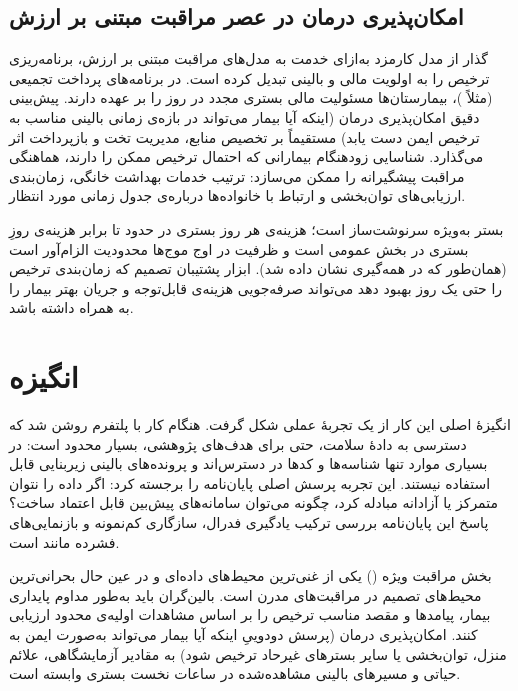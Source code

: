 \subsection{امکان‌پذیری درمان در عصر مراقبت مبتنی بر ارزش}

گذار از مدل کارمزد به‌ازای خدمت به مدل‌های مراقبت مبتنی بر ارزش، برنامه‌ریزی ترخیص را به اولویت مالی و بالینی تبدیل کرده است. در برنامه‌های پرداخت تجمیعی (مثلاً )، بیمارستان‌ها مسئولیت مالی بستری مجدد در  روز را بر عهده دارند. پیش‌بینی دقیق امکان‌پذیری درمان (اینکه آیا بیمار می‌تواند در بازه‌ی زمانی بالینی مناسب به ترخیص ایمن دست یابد) مستقیماً بر تخصیص منابع، مدیریت تخت و بازپرداخت اثر می‌گذارد. شناسایی زودهنگام بیمارانی که احتمال ترخیص ممکن را دارند، هماهنگی مراقبت پیشگیرانه را ممکن می‌سازد: ترتیب خدمات بهداشت خانگی، زمان‌بندی ارزیابی‌های توان‌بخشی و ارتباط با خانواده‌ها درباره‌ی جدول زمانی مورد انتظار.

بستر  به‌ویژه سرنوشت‌ساز است؛ هزینه‌ی هر روز بستری در  حدود  تا  برابر هزینه‌ی روزِ بستری در بخش عمومی است و ظرفیت  در اوج موج‌ها محدودیت الزام‌آور است (همان‌طور که در همه‌گیری  نشان داده شد). ابزار پشتیبان تصمیم که زمان‌بندی ترخیص را حتی یک روز بهبود دهد می‌تواند صرفه‌جویی هزینه‌ی قابل‌توجه و جریان بهتر بیمار را به همراه داشته باشد.

\section{انگیزه}

انگیزۀ اصلی این کار از یک تجربۀ عملی شکل گرفت. هنگام کار با پلتفرم  روشن شد که دسترسی به دادۀ سلامت، حتی برای هدف‌های پژوهشی، بسیار محدود است: در بسیاری موارد تنها شناسه‌ها و کدها در دسترس‌اند و پرونده‌های بالینی زیربنایی قابل استفاده نیستند. این تجربه پرسش اصلی پایان‌نامه را برجسته کرد: اگر داده را نتوان متمرکز یا آزادانه مبادله کرد، چگونه می‌توان سامانه‌های پیش‌بین قابل اعتماد ساخت؟ پاسخ این پایان‌نامه بررسی ترکیب یادگیری فدرال، سازگاری کم‌نمونه و بازنمایی‌های فشرده مانند  است.

بخش مراقبت ویژه () یکی از غنی‌ترین محیط‌های داده‌ای و در عین حال بحرانی‌ترین محیط‌های تصمیم در مراقبت‌های مدرن است. بالین‌گران باید به‌طور مداوم پایداری بیمار، پیامدها و مقصد مناسب ترخیص را بر اساس مشاهدات اولیه‌ی محدود ارزیابی کنند. امکان‌پذیری درمان (پرسش دودوییِ اینکه آیا بیمار می‌تواند به‌صورت ایمن به منزل، توان‌بخشی یا سایر بسترهای غیرحاد ترخیص شود) به مقادیر آزمایشگاهی، علائم حیاتی و مسیرهای بالینی مشاهده‌شده در ساعات نخست بستری  وابسته است.

